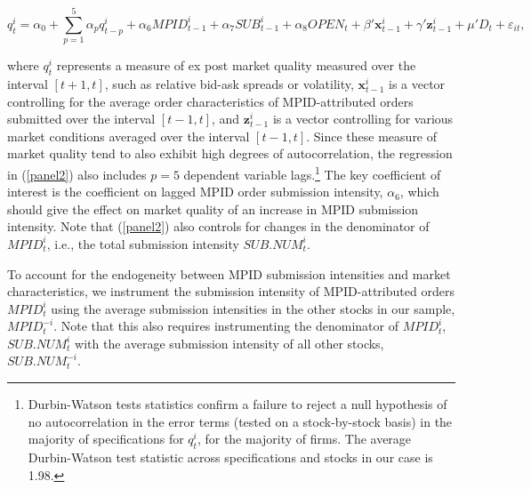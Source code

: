 \documentclass{article}
\begin{document}
\begin{equation}
q_t^{i}=\alpha_0 + \sum_{p=1}^5 \alpha_p q_{t-p}^i + \alpha_6 MPID_{t-1}^i + \alpha_7 SUB_{t-1}^i + \alpha_8 OPEN_t +\beta'\textbf{x}_{t-1}^i+\gamma'\textbf{z}_{t-1}^i+\mu'D_t+\varepsilon_{it}, \label{panel2}
\end{equation}

\noindent where $q_t^{i}$ represents a measure of ex post market quality measured over the interval $[t+1,t]$, such as relative bid-ask spreads or volatility, $\textbf{x}_{t-1}^i$ is a vector controlling for the average order characteristics of MPID-attributed orders submitted over the interval $[t-1,t]$, and $\textbf{z}_{t-1}^i$ is a vector controlling for various market conditions averaged over the interval $[t-1,t]$. Since these measure of market quality tend to also exhibit high degrees of autocorrelation, the regression in (\ref{panel2}) also includes $p=5$ dependent variable lags.\footnote{Durbin-Watson tests statistics confirm a failure to reject a null hypothesis of no autocorrelation in the error terms (tested on a stock-by-stock basis) in the majority of specifications for $q_t^i$, for the majority of firms. The average Durbin-Watson test statistic across specifications and stocks in our case is 1.98.} The key coefficient of interest is the coefficient on lagged MPID order submission intensity, $\alpha_6$, which should give the effect on market quality of an increase in MPID submission intensity. Note that (\ref{panel2}) also controls for changes in the denominator of $MPID_t^i$, i.e., the total submission intensity $SUB.NUM_t^i$. 


To account for the endogeneity between MPID submission intensities and market characteristics, we instrument the submission intensity of MPID-attributed orders $MPID_t^{i}$ using the average submission intensities in the other stocks in our sample, $MPID_t^{-i}$. Note that this also requires instrumenting the denominator of $MPID_t^{i}$, $SUB.NUM_t^{i}$ with the average submission intensity of all other stocks, $SUB.NUM_t^{-i}$.
\end{document}
